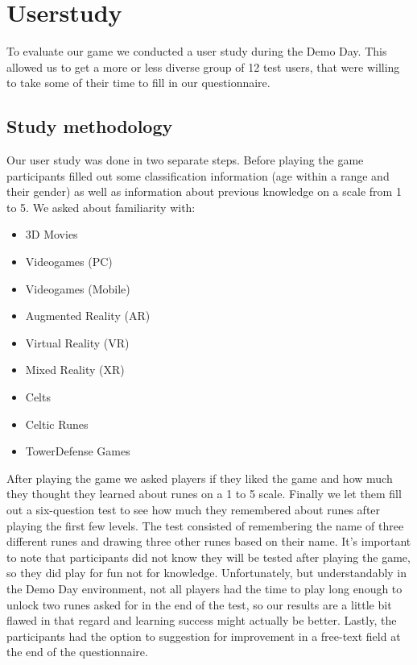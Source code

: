 \section{Userstudy}

To evaluate our game we conducted a user study during the Demo Day. This allowed us to get a more or less diverse group of 12 test users, that were willing to take some of their time to fill in our questionnaire.

\subsection{Study methodology}

Our user study was done in two separate steps. Before playing the game participants filled out some classification information (age within a range and their gender) as well as information about previous knowledge on a scale from 1 to 5. We asked about familiarity with:

\begin{itemize}
	\item 3D Movies
	\item Videogames (PC)
	\item Videogames (Mobile)
	\item Augmented Reality (AR)
	\item Virtual Reality (VR)
	\item Mixed Reality (XR)
	\item Celts
	\item Celtic Runes
	\item TowerDefense Games
\end{itemize}

After playing the game we asked players if they liked the game and how much they thought they learned about runes on a 1 to 5 scale. Finally we let them fill out a six-question test to see how much they remembered about runes after playing the first few levels.
The test consisted of remembering the name of three different runes and drawing three other runes based on their name.
It's important to note that participants did not know they will be tested after playing the game, so they did play for fun not for knowledge.
Unfortunately, but understandably in the Demo Day environment, not all players had the time to play long enough to unlock two runes asked for in the end of the test, so our results are a little bit flawed in that regard and learning success might actually be better.
Lastly, the participants had the option to suggestion for improvement in a free-text field at the end of the questionnaire.

